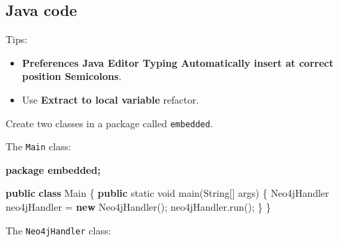 \documentclass[]{report}
\newenvironment{Shaded}{}{}
\newcommand{\KeywordTok}[1]{\textcolor[rgb]{0.00,0.44,0.13}{\textbf{{#1}}}}
\newcommand{\DataTypeTok}[1]{\textcolor[rgb]{0.56,0.13,0.00}{{#1}}}
\newcommand{\FunctionTok}[1]{\textcolor[rgb]{0.02,0.16,0.49}{{#1}}}
\newcommand{\NormalTok}[1]{{#1}}
\begin{document}
\subsection{Java code}

Tips:

\begin{itemize}
\itemsep1pt\parskip0pt
\item
  \textbf{Preferences \textbar{} Java \textbar{} Editor \textbar{}
  Typing \textbar{} Automatically insert at correct position \textbar{}
  Semicolons}.
\item
  Use \textbf{Extract to local variable} refactor.
\end{itemize}

Create two classes in a package called \texttt{embedded}.

The \texttt{Main} class:

\begin{Shaded}
\begin{Highlighting}[]
\KeywordTok{package embedded;}

\KeywordTok{public} \KeywordTok{class} \NormalTok{Main \{}
    \KeywordTok{public} \DataTypeTok{static} \DataTypeTok{void} \FunctionTok{main}\NormalTok{(String[] args) \{}
        \NormalTok{Neo4jHandler neo4jHandler = }\KeywordTok{new} \FunctionTok{Neo4jHandler}\NormalTok{();}
        \NormalTok{neo4jHandler.}\FunctionTok{run}\NormalTok{();}
    \NormalTok{\}}
\NormalTok{\}}
\end{Highlighting}
\end{Shaded}

The \texttt{Neo4jHandler} class:
\end{document}
